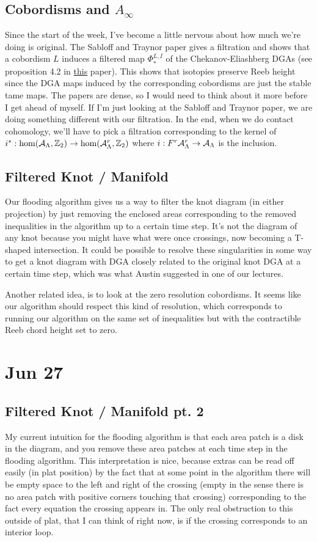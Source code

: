 \documentclass[11pt,oneside]{amsart}
\begin{document}
\subsection{Cobordisms and $A_\infty$} Since the start of the week, I've become a little nervous about how much we're doing is original. The Sabloff and Traynor paper gives a filtration and shows that a cobordism $L$ induces a filtered map $\Phi_\ast^{L,I}$ of the Chekanov-Eliashberg DGAs (see proposition 4.2 in \href{https://arxiv.org/pdf/2101.03760.pdf}{this} paper). This shows that isotopies preserve Reeb height since the DGA maps induced by the corresponding cobordisms are just the stable tame maps. The papers are dense, so I would need to think about it more before I get ahead of myself. If I'm just looking at the Sabloff and Traynor paper, we are doing something different with our filtration. In the end, when we do contact cohomology, we'll have to pick a filtration corresponding to the kernel of $i^\ast:\hom(\mathcal{A}_{\Lambda}, \mathbb Z_2)\rightarrow \hom(\mathcal{A}_{\Lambda}^r, \mathbb Z_2)$ where $i:F^r \mathcal{A}_{\Lambda}^r\rightarrow \mathcal{A}_{\Lambda}$ is the inclusion.


\subsection{Filtered Knot / Manifold} 

Our flooding algorithm gives us a way to filter the knot diagram (in either projection) by just removing the enclosed areas corresponding to the removed inequalities in the algorithm up to a certain time step. It's not the diagram of any knot because you might have what were once crossings, now becoming a T-shaped intersection. It could be possible to resolve these singularities in some way to get a knot diagram with DGA closely related to the original knot DGA at a certain time step, which was what Austin suggested in one of our lectures.

Another related idea, is to look at the zero resolution cobordisms. It seems like our algorithm should respect this kind of resolution, which corresponds to running our algorithm on the same set of inequalities but with the contractible Reeb chord height set to zero.

\section{Jun 27}

\subsection{Filtered Knot / Manifold pt. 2} My current intuition for the flooding algorithm is that each area patch is a disk in the diagram, and you remove these area patches at each time step in the flooding algorithm. This interpretation is nice, because extras can be read off easily (in plat position) by the fact that at some point in the algorithm there will be empty space to the left and right of the crossing (empty in the sense there is no area patch with positive corners touching that crossing) corresponding to the fact every equation the crossing appears in. The only real obstruction to this outside of plat, that I can think of right now, is if the crossing corresponds to an interior loop.
\end{document}
